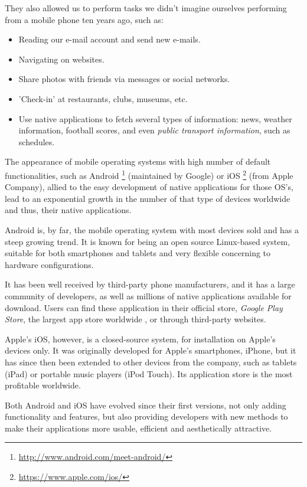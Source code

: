 They also allowed us to perform tasks we didn't imagine ourselves performing from a mobile phone ten years ago, such as:

\begin{itemize}
\item Reading our e-mail account and send new e-mails.
\item Navigating on websites.
\item Share photos with friends via messages or social networks.
\item 'Check-in' at restaurants, clubs, museums, etc.
\item Use native applications to fetch several types of information: news, weather information, football scores, and even \emph{public transport information}, such as schedules.
\end{itemize}

The appearance of mobile operating systems with high number of default functionalities, such as Android \footnote{\url{http://www.android.com/meet-android/}} (maintained by Google) or iOS \footnote{\url{https://www.apple.com/ios/}} (from Apple Company), allied to the easy development of native applications for those OS's, lead to an exponential growth in the number of that type of devices worldwide and thus, their native applications.

Android is, by far, the mobile operating system with most devices sold \cite{kn:McG13} and has a steep growing trend. It is known for being an open source Linux-based system, suitable for both smartphones and tablets and very flexible concerning to hardware configurations.

It has been well received by third-party phone manufacturers, and it has a large community of developers, as well as millions of native applications available for download. Users can find these application in their official store, \emph{Google Play Store}, the largest app store worldwide \cite{kn:Are13}, or through third-party websites.

Apple's iOS, however, is a closed-source system, for installation on Apple's devices only. 
It was originally developed for Apple's smartphones, iPhone, but it has since then been extended to other devices from the company, such as tablets (iPad) or portable music players (iPod Touch). Its application store is the most profitable worldwide.

Both Android and iOS have evolved since their first versions, not only adding functionality and features, but also providing developers with new methods to make their applications more usable, efficient and aesthetically attractive.

